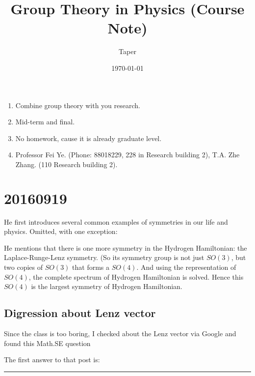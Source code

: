 \documentclass{article}
\title{Group Theory in Physics (Course Note)}
\date{\today}
\author{Taper}
\numberwithin{equation}{subsection} %
\theoremstyle{definition}
\begin{document}
\maketitle
{}
\tableofcontents
\begin{enumerate}
    \item Combine group theory with you research.
    \item Mid-term and final.
    \item No homework, cause it is already graduate level.
    \item Professor Fei Ye. (Phone: 88018229, 228 in Research building 2), 
        T.A. Zhe Zhang. (110 Research building 2).
\end{enumerate}

\section{20160919}
\label{sec:20160919}

He first introduces several common examples of symmetries in our life and
physics. Omitted, with one exception:

He mentions that there is one more symmetry in the Hydrogen 
Hamiltonian: the Laplace-Runge-Lenz symmetry. (So its symmetry 
group is not just $SO(3)$, but two copies of $SO(3)$ that forms a $SO(4)$.
And using the representation of $SO(4)$, the complete spectrum of
Hydrogen Hamiltonian is solved. Hence this $SO(4)$ is the largest
symmetry of Hydrogen Hamiltonian.

    \subsection{Digression about Lenz vector}
    \label{sec:Digression_about_Lenz_vector}
    Since the class is too boring, I checked about the Lenz vector via
    Google and found this Math.SE question \cite{math.se_1_lenz_vector}

    The first answer to that post is:

    \begin{center}\noindent\rule{8cm}{0.4pt}\end{center}
\end{document}
